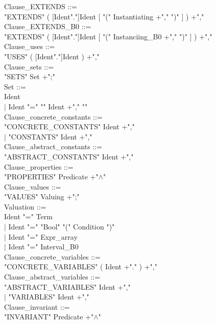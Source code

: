 \documentclass[12pt,a4paper,draft]{report}
\begin{document}
{\begin{sloppypar}
\noindent Clause\_EXTENDS ::= \\
  "EXTENDS" ( [Ident"."]Ident  [ "(" Instantiating +","  ")" ] ) +","\\
Clause\_EXTENDS\_B0 ::= \\
  "EXTENDS" ( [Ident"."]Ident  [ "(" Instanciing\_B0 +","  ")" ] ) +","\\
Clause\_uses ::= \\
  "USES" ( [Ident"."]Ident ) +","\\
Clause\_sets ::= \\
  "SETS" Set +";"\\
Set ::= \\
  Ident \\
\hspace*{0.20in} $|$ Ident  "="  "{" Ident +","  "}" \\
Clause\_concrete\_constants ::= \\
  "CONCRETE\_CONSTANTS"  Ident +","\\
\hspace*{0.20in} $|$ "CONSTANTS"  Ident +","\\
Clause\_abstract\_constants ::= \\
  "ABSTRACT\_CONSTANTS"  Ident +","\\
Clause\_properties ::= \\
  "PROPERTIES"  Predicate +"$\land$"\\
Clause\_values ::= \\
  "VALUES"  Valuing +";"\\
Valuation  ::= \\
  Ident  "="  Term\\
\hspace*{0.20in} $|$ Ident  "="  "Bool" "(" Condition ")" \\
\hspace*{0.20in} $|$ Ident  "="  Expr\_array\\
\hspace*{0.20in} $|$ Ident  "="  Interval\_B0\\
Clause\_concrete\_variables ::= \\
  "CONCRETE\_VARIABLES"  ( Ident +"."  ) +","\\
Clause\_abstract\_variables ::= \\
  "ABSTRACT\_VARIABLES"  Ident +","\\
\hspace*{0.20in} $|$ "VARIABLES" Ident +","\\
Clause\_invariant ::= \\
  "INVARIANT"  Predicate +"$\land$"\\

\end{sloppypar}}
\end{document}
